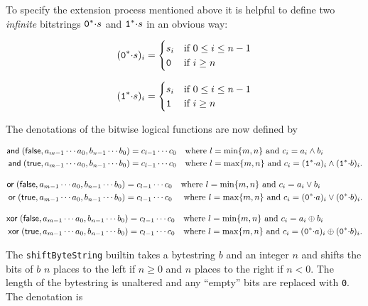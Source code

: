 \noindent To specify the extension process mentioned above it is helpful to define two
\textit{infinite} bitstrings $\mathtt{0}^*{\cdot}s$ and $\mathtt{1}^*{\cdot}s$ in an obvious way:

$$
(\mathtt{0}^*{\cdot}s)_i =
\begin{cases}
  s_i & \text{if $0 \leq i \leq n-1$}\\
  \mathtt{0} & \text{if $i \geq n$}
\end{cases}
$$

$$
(\mathtt{1}^*{\cdot}s)_i =
\begin{cases}
  s_i & \text{if $0 \leq i \leq n-1$}\\
  \mathtt{1} & \text{if $i \geq n$}
\end{cases}
$$

\noindent The denotations of the bitwise logical functions are now defined by

\begin{align*}
\mathsf{and}\;(\mathsf{false}, a_{m-1} \cdots a_0, b_{n-1} \cdots b_0) &= c_{l-1} \cdots c_0 
\quad \text{where $l=\min\{m,n\}$ and $c_i = a_i \wedge b_i$}\\
\mathsf{and}\;(\mathsf{true}, a_{m-1} \cdots a_0, b_{n-1} \cdots b_0) &= c_{l-1} \cdots c_0
\quad \text{where $l=\max\{m,n\}$ and $c_i = (\mathtt{1}^*{\cdot}a)_i \wedge(\mathtt{1}^*{\cdot}b)_i$.}
\end{align*}


\begin{align*}
\mathsf{or}\;(\mathsf{false}, a_{m-1} \cdots a_0, b_{n-1} \cdots b_0) &= c_{l-1} \cdots c_0
  \quad \text{where $l=\min\{m,n\}$ and $c_i = a_i \vee b_i$}\\
\mathsf{or}\;(\mathsf{true}, a_{m-1} \cdots a_0, b_{n-1} \cdots b_0) &= c_{l-1} \cdots c_0 
\quad \text{ where $l=\max\{m,n\}$ and $c_i = (\mathtt{0}^*{\cdot}a)_i \vee (\mathtt{0}^*{\cdot}b)_i$.}
\end{align*}


\begin{align*}
\mathsf{xor}\;(\mathsf{false}, a_{m-1} \cdots a_0, b_{n-1} \cdots b_0) &= c_{l-1} \cdots c_0 
\quad \text{where $l=\min\{m,n\}$ and $c_i = a_i \oplus b_i$}\\
\mathsf{xor}\;(\mathsf{true}, a_{m-1} \cdots a_0, b_{n-1} \cdots b_0) &= c_{l-1} \cdots c_0 
\quad \text{where $l=\max\{m,n\}$ and $c_i = (\mathtt{0}^*{\cdot}a)_i \oplus (\mathtt{0}^*{\cdot}b)_i$.}
\end{align*}


\label{note:shift}

The \texttt{shiftByteString} builtin takes a bytestring $b$ and an integer $n$ and
shifts the bits of $b$ $n$ places to the left if $n \geq 0$ and $n$ places to
the right if $n < 0$.  The length of the bytestring is unaltered and any
``empty'' bits are replaced with \texttt{0}. The denotation is 

